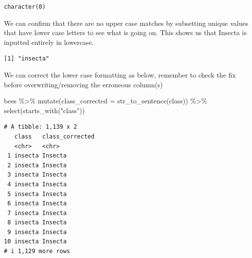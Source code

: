 \documentclass[
  letterpaper,
  DIV=11,
  numbers=noendperiod,
  oneside]{scrreprt}
\newenvironment{Shaded}{\begin{snugshade}}{\end{snugshade}}
\newcommand{\AttributeTok}[1]{\textcolor[rgb]{0.40,0.45,0.13}{#1}}
\newcommand{\FunctionTok}[1]{\textcolor[rgb]{0.28,0.35,0.67}{#1}}
\newcommand{\NormalTok}[1]{\textcolor[rgb]{0.00,0.23,0.31}{#1}}
\newcommand{\SpecialCharTok}[1]{\textcolor[rgb]{0.37,0.37,0.37}{#1}}
\newcommand{\StringTok}[1]{\textcolor[rgb]{0.13,0.47,0.30}{#1}}
\begin{document}
\begin{Shaded}
\end{Shaded}

\begin{verbatim}
character(0)
\end{verbatim}

We can confirm that there are no upper case matches by subsetting unique
values that have lower case letters to see what is going on. This shows
us that Insecta is inputted entirely in lowercase.

\begin{Shaded}
\end{Shaded}

\begin{verbatim}
[1] "insecta"
\end{verbatim}

We can correct the lower case formatting as below, remember to check the
fix before overwriting/removing the erroneous column(s)

\begin{Shaded}
\begin{Highlighting}[]
\NormalTok{bees }\SpecialCharTok{\%\textgreater{}\%} 
  \FunctionTok{mutate}\NormalTok{(}\AttributeTok{class\_corrected =} \FunctionTok{str\_to\_sentence}\NormalTok{(class)) }\SpecialCharTok{\%\textgreater{}\%}
  \FunctionTok{select}\NormalTok{(}\FunctionTok{starts\_with}\NormalTok{(}\StringTok{"class"}\NormalTok{))}
\end{Highlighting}
\end{Shaded}

\begin{verbatim}
# A tibble: 1,139 x 2
   class   class_corrected
   <chr>   <chr>          
 1 insecta Insecta        
 2 insecta Insecta        
 3 insecta Insecta        
 4 insecta Insecta        
 5 insecta Insecta        
 6 insecta Insecta        
 7 insecta Insecta        
 8 insecta Insecta        
 9 insecta Insecta        
10 insecta Insecta        
# i 1,129 more rows
\end{verbatim}
\end{document}
